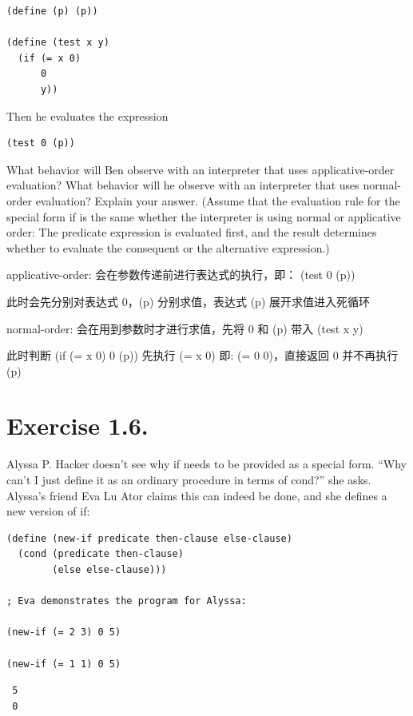 \documentclass[11pt]{article}
\begin{document}
\begin{verbatim}
(define (p) (p))

(define (test x y)
  (if (= x 0)
      0
      y))
\end{verbatim}

Then he evaluates the expression


\begin{verbatim}
(test 0 (p))
\end{verbatim}

  What behavior will Ben observe with an interpreter that uses applicative-order
evaluation? What behavior will he observe with an interpreter that uses
normal-order evaluation? Explain your answer. (Assume that the evaluation rule
for the special form if is the same whether the interpreter is using normal or
applicative order: The predicate expression is evaluated first, and the result
determines whether to evaluate the consequent or the alternative expression.)

  applicative-order: 会在参数传递前进行表达式的执行，即： (test 0 (p))

  此时会先分别对表达式 0，(p) 分别求值，表达式 (p) 展开求值进入死循环

  normal-order: 会在用到参数时才进行求值，先将 0 和 (p) 带入 (test x y)

  此时判断 (if (= x 0) 0 (p)) 先执行 (= x 0) 即: (= 0 0)，直接返回 0 并不再执行(p)
\section{Exercise 1.6.}
\label{sec-6}


  Alyssa P. Hacker doesn't see why if needs to be provided as a special form.
  ``Why can't I just define it as an ordinary procedure in terms of cond?''
  she asks. Alyssa's friend Eva Lu Ator claims this can indeed be done,
  and she defines a new version of if:


\begin{verbatim}
(define (new-if predicate then-clause else-clause)
  (cond (predicate then-clause)
        (else else-clause)))

; Eva demonstrates the program for Alyssa:

(new-if (= 2 3) 0 5)

(new-if (= 1 1) 0 5)
\end{verbatim}

\begin{verbatim}
 5
 0
\end{verbatim}
\end{document}
